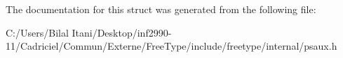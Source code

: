 The documentation for this struct was generated from the following file\+:\begin{DoxyCompactItemize}
\item 
C\+:/\+Users/\+Bilal Itani/\+Desktop/inf2990-\/11/\+Cadriciel/\+Commun/\+Externe/\+Free\+Type/include/freetype/internal/psaux.\+h\end{DoxyCompactItemize}

